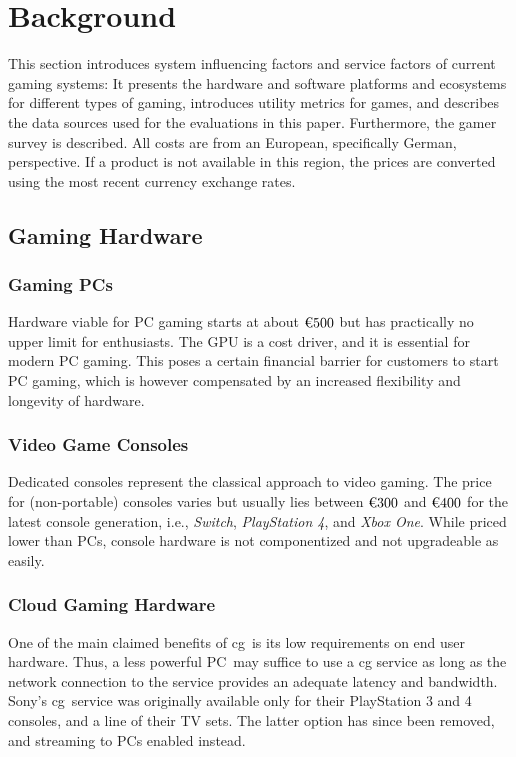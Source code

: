 \section{Background}
\label{sec:background}
This section introduces system influencing factors and service factors
of current gaming systems:
It presents the hardware and software platforms and ecosystems
for different types of gaming, introduces utility metrics for games,
and describes the data sources used for the evaluations in this paper.
Furthermore, the gamer survey is described.
All costs are from an European, specifically German, perspective. If a
product is not available in this region, the prices are converted using
the most recent currency exchange rates.

\subsection{Gaming Hardware}\label{sec:gaming-hardware}

\subsubsection{Gaming \acrshort{PC}s}
Hardware viable for \gls{PC} gaming starts at about $\text{\texteuro} 500$ but
has practically no upper limit for enthusiasts. The \gls{GPU}
is a cost driver, and it is essential for modern \gls{PC} gaming.
This poses a certain financial barrier for customers to start \gls{PC} gaming,
which is however compensated by an increased flexibility and longevity of
hardware.

\subsubsection{Video Game Consoles}
Dedicated consoles represent the classical approach to video gaming.
The price for (non-portable) consoles varies but usually lies between
$\text{\texteuro} 300$ and $\text{\texteuro} 400$ for the latest console
generation, i.e., \textit{Switch}, \textit{PlayStation 4}, and
\textit{Xbox One}.
While priced lower than \glspl{PC}, console hardware is not componentized
and not upgradeable as easily.

\subsubsection{Cloud Gaming Hardware}
One of the main claimed benefits of \gls{cg} is its low requirements
on end user hardware. Thus, a less powerful \gls{PC} may suffice to
use a \gls{cg} service as long as the network connection to the
service provides an adequate latency and bandwidth.
Sony's \psnow \gls{cg} service was originally available only for their
PlayStation 3 and 4 consoles, and a line of their TV sets. The latter
option has since been removed, and streaming to \glspl{PC} enabled
instead.

